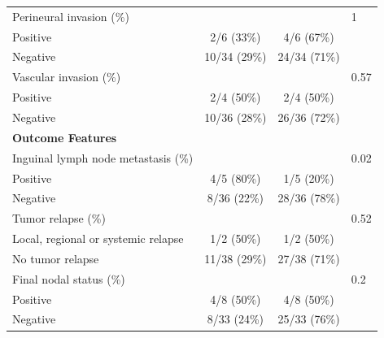 \documentclass[11pt,letterpaper]{article}\usepackage[]{graphicx}\usepackage[]{color}
\begin{document}
\begin{multicols}{2}
\begin{table}
\begin{tabular}{lccl}
\hspace{2ex} Perineural invasion (\%) & ~ & ~ & 1 \\
\hspace{4ex} Positive
        & 2/6 (33\%)
        & 4/6 (67\%)
        & ~ \\
\hspace{4ex} Negative
        & 10/34 (29\%)
        & 24/34 (71\%)
        & ~ \\

\hspace{2ex} Vascular invasion (\%) & ~ & ~ & 0.57 \\
\hspace{4ex} Positive
        & 2/4 (50\%)
        & 2/4 (50\%)
        & ~ \\
\hspace{4ex} Negative
        & 10/36 (28\%)
        & 26/36 (72\%)
        & ~ \\

\textbf{Outcome Features} & ~ & ~ & ~ \\
\hspace{2ex} Inguinal lymph node metastasis (\%) & ~ & ~ & 0.02 \\
\hspace{4ex} Positive
        & 4/5 (80\%)
        & 1/5 (20\%)
        & ~ \\
\hspace{4ex} Negative
        & 8/36 (22\%)
        & 28/36 (78\%)
        & ~ \\

\hspace{2ex} Tumor relapse (\%) & ~ & ~ & 0.52 \\
\hspace{4ex} Local, regional or systemic relapse
        & 1/2 (50\%)
        & 1/2 (50\%)
        & ~ \\
\hspace{4ex} No tumor relapse
        & 11/38 (29\%)
        & 27/38 (71\%)
        & ~ \\

\hspace{2ex} Final nodal status (\%) & ~ & ~ & 0.2 \\
\hspace{4ex} Positive
        & 4/8 (50\%)
        & 4/8 (50\%)
        & ~ \\
\hspace{4ex} Negative
        & 8/33 (24\%)
        & 25/33 (76\%)
        & ~ \\


\end{tabular}
\end{table}
\end{multicols}
\end{document}
